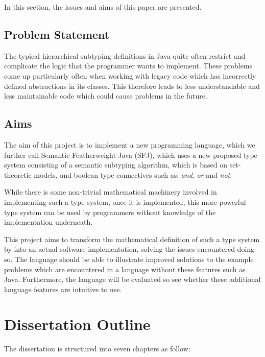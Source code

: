 \documentclass{l4proj}
\begin{document}
In this section, the issues and aims of this paper are presented.

\subsection{Problem Statement}

The typical hierarchical subtyping definitions in Java quite often restrict and complicate the logic that the programmer wants to implement.
These problems come up particularly often when working with legacy code which has incorrectly defined abstractions in its classes.
This therefore leads to less understandable and less maintainable code which could cause problems in the future.

\subsection{Aims}

The aim of this project is to implement a new programming language, which we further call Semantic Featherweight Java (SFJ), which uses a new proposed type system consisting of a semantic subtyping algorithm, which is based on set-theoretic models, and boolean type connectives such as: \emph{and}, \emph{or} and \emph{not}.

While there is some non-trivial mathematical machinery involved in implementing such a type system, once it is implemented, this more powerful type system can be used by programmers without knowledge of the implementation underneath.

This project aims to transform the mathematical definition of such a type system by \citet{Dardha2013, Dardha2017} into an actual software implementation, solving the issues encountered doing so.
The language should be able to illustrate improved solutions to the example problems which are encountered in a language without these features such as Java.
Furthermore, the language will be evaluated so see whether these additional language features are intuitive to use.

\section{Dissertation Outline}

The dissertation is structured into seven chapters as follow:
\end{document}
